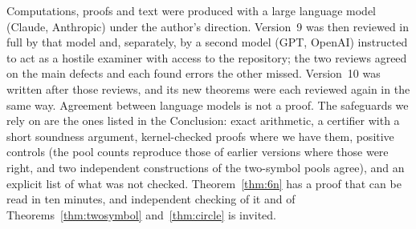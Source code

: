 Computations, proofs and text were produced with a large language model (Claude, Anthropic)
under the author's direction.  Version~9 was then reviewed in full by that model and, separately,
by a second model (GPT, OpenAI) instructed to act as a hostile examiner with access to the
repository; the two reviews agreed on the main defects and each found errors the other missed.
Version~10 was written after those reviews, and its new theorems were each reviewed again in the
same way.  Agreement between language models is not a
proof.  The safeguards we rely on are the ones listed in the Conclusion: exact arithmetic, a
certifier with a short soundness argument, kernel-checked proofs where we have them, positive
controls (the pool counts reproduce those of earlier versions where
those were right, and two independent constructions of the two-symbol pools agree), and an explicit list of what was not checked.  Theorem~\ref{thm:6n} has a
proof that can be read in ten minutes, and independent checking of it and of
Theorems~\ref{thm:twosymbol} and~\ref{thm:circle} is invited.
